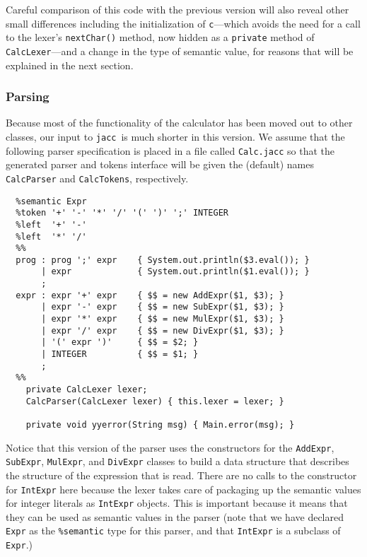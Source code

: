\documentclass[12pt]{article}
\def\jacc{{\tt jacc}}
\begin{document}
Careful comparison of this code with the previous version
will also reveal other small differences including the
initialization of \verb"c"---which avoids the need for a
call to the lexer's \verb"nextChar()" method, now hidden
as a \verb"private" method of \verb"CalcLexer"---and a
change in the type of semantic value, for reasons that
will be explained in the next section.

\subsubsection{Parsing}
Because most of the functionality of the calculator has been moved out
to other classes, our input to \jacc\ is much shorter in this version.
We assume that the following parser specification is placed in a file
called \verb"Calc.jacc" so that the generated parser and tokens interface
will be given the (default) names \verb"CalcParser" and \verb"CalcTokens",
respectively.
{\small
\begin{verbatim}
  %semantic Expr
  %token '+' '-' '*' '/' '(' ')' ';' INTEGER
  %left  '+' '-'
  %left  '*' '/'
  %%
  prog : prog ';' expr    { System.out.println($3.eval()); }
       | expr             { System.out.println($1.eval()); }
       ;
  expr : expr '+' expr    { $$ = new AddExpr($1, $3); }
       | expr '-' expr    { $$ = new SubExpr($1, $3); }
       | expr '*' expr    { $$ = new MulExpr($1, $3); }
       | expr '/' expr    { $$ = new DivExpr($1, $3); }
       | '(' expr ')'     { $$ = $2; }
       | INTEGER          { $$ = $1; }
       ;
  %%
    private CalcLexer lexer;
    CalcParser(CalcLexer lexer) { this.lexer = lexer; }
  
    private void yyerror(String msg) { Main.error(msg); }
\end{verbatim}
}%
Notice that this version of the parser uses the constructors for
the \verb"AddExpr", \verb"SubExpr", \verb"MulExpr", and
\verb"DivExpr" classes to build a data structure that describes
the structure of the expression that is read.  There are no
calls to the constructor for \verb"IntExpr" here because the
lexer takes care of packaging up the semantic values for integer
literals as \verb"IntExpr" objects.  This is important because
it means that they can be used as semantic values in the parser
(note that we have declared \verb"Expr" as the \verb"%semantic"
type for this parser, and that \verb"IntExpr" is a subclass of
\verb"Expr".)
\end{document}
